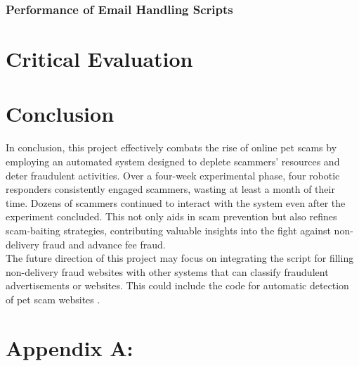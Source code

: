 \documentclass[ oneside,%
                    author={Cassie Qing Tang},
                    degree={BSc},
                     title={An Automated Response System for Disrupting Online Pet Scamming \\ },
                    subtitle={ }]{dissertation}
\begin{document}
\subsection{Performance of Email Handling Scripts}





\chapter{Critical Evaluation}









\chapter{Conclusion}
In conclusion, this project effectively combats the rise of online pet scams by employing an automated system designed to deplete scammers' resources and deter fraudulent activities. Over a four-week experimental phase, four robotic responders consistently engaged scammers, wasting at least a month of their time. Dozens of scammers continued to interact with the system even after the experiment concluded. This not only aids in scam prevention but also refines scam-baiting strategies, contributing valuable insights into the fight against non-delivery fraud and advance fee fraud.
\\

The future direction of this project may focus on integrating the script for filling non-delivery fraud websites with other systems that can classify fraudulent advertisements or websites. This could include the code for automatic detection of pet scam websites \cite{mehmedov_automated_2021}.



% 


\appendix

\chapter{Appendix A: }
\label{}
\end{document}
